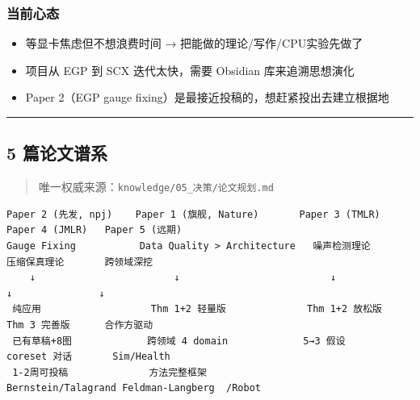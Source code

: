 \documentclass[
  12pt,
]{ctexart}
\providecommand{\tightlist}{%
  \setlength{\itemsep}{0pt}\setlength{\parskip}{0pt}}
\begin{document}
\subsubsection{当前心态}\label{ux5f53ux524dux5fc3ux6001}

\begin{itemize}
\tightlist
\item
  等显卡焦虑但不想浪费时间 → 把能做的理论/写作/CPU实验先做了
\item
  项目从 EGP 到 SCX 迭代太快，需要 Obsidian 库来追溯思想演化
\item
  Paper 2（EGP gauge fixing）是最接近投稿的，想赶紧投出去建立根据地
\end{itemize}

\begin{center}\rule{0.5\linewidth}{0.5pt}\end{center}

\subsection{5 篇论文谱系}\label{ux7bc7ux8bbaux6587ux8c31ux7cfb}

\begin{quote}
唯一权威来源：\texttt{knowledge/05\_决策/论文规划.md}
\end{quote}

\begin{verbatim}
Paper 2 (先发, npj)    Paper 1 (旗舰, Nature)       Paper 3 (TMLR)    Paper 4 (JMLR)   Paper 5 (远期)
Gauge Fixing           Data Quality > Architecture   噪声检测理论        压缩保真理论       跨领域深挖
    ↓                        ↓                          ↓                  ↓               ↓
 纯应用                   Thm 1+2 轻量版              Thm 1+2 放松版     Thm 3 完善版      合作方驱动
 已有草稿+8图             跨领域 4 domain             5→3 假设           coreset 对话       Sim/Health
 1-2周可投稿              方法完整框架                 Bernstein/Talagrand Feldman-Langberg  /Robot
\end{verbatim}
\end{document}
